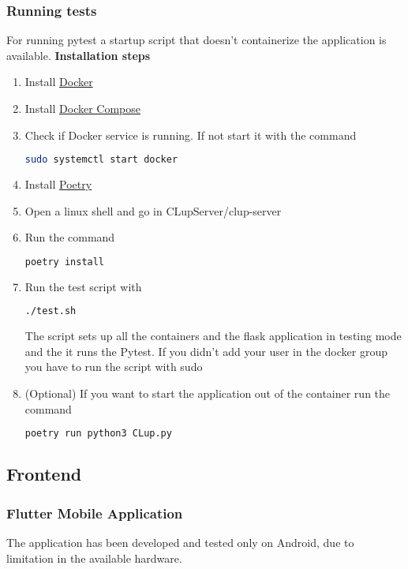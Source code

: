 \subsubsection{Running tests}
For running pytest a startup script that doesn't containerize the application is available.
\textbf{Installation steps}
\begin{enumerate}
    \item Install \href{https://docs.docker.com/get-docker/}{Docker}
    \item Install \href{https://docs.docker.com/compose/install/}{Docker Compose}
    \item Check if Docker service is running. If not start it with the command
          \begin{lstlisting}[language=bash]
    sudo systemctl start docker
    \end{lstlisting}
    \item Install \href{https://python-poetry.org/}{Poetry}
    \item Open a linux shell and go in CLupServer/clup-server
    \item Run the command
          \begin{lstlisting}[language=bash]
    poetry install
    \end{lstlisting}
    \item Run the test script with
          \begin{lstlisting}[language=bash]
    ./test.sh
    \end{lstlisting}
          The script sets up all the containers and the flask application in testing mode and the it runs the Pytest.
          If you didn't add your user in the docker group
          you have to run the script with sudo
    \item (Optional) If you want to start the application out of the container run the command
          \begin{lstlisting}[language=bash]
    poetry run python3 CLup.py
    \end{lstlisting}
\end{enumerate}

\clearpage

\subsection{Frontend}

\subsubsection{Flutter Mobile Application}
The application has been developed and tested only on Android, due to limitation in the available hardware.

